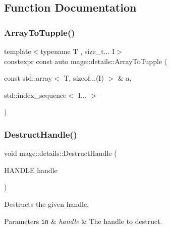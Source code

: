 \subsection{Function Documentation}
\mbox{\label{namespacemage_1_1details_a282e14de1d24b9f356912f8ac3bb868d}} 
\subsubsection{\texorpdfstring{Array\+To\+Tupple()}{ArrayToTupple()}}
{\footnotesize\ttfamily template$<$typename T , size\+\_\+t... I$>$ \\
constexpr const auto mage\+::details\+::\+Array\+To\+Tupple (\begin{DoxyParamCaption}\item[{const std\+::array$<$ T, sizeof...(I) $>$ \&}]{a,  }\item[{std\+::index\+\_\+sequence$<$ I... $>$}]{ }\end{DoxyParamCaption})\hspace{0.3cm}{\ttfamily [noexcept]}}

\mbox{\label{namespacemage_1_1details_a213580128442b2980ad4c3c82bf80ee8}} 
\subsubsection{\texorpdfstring{Destruct\+Handle()}{DestructHandle()}}
{\footnotesize\ttfamily void mage\+::details\+::\+Destruct\+Handle (\begin{DoxyParamCaption}\item[{H\+A\+N\+D\+LE}]{handle }\end{DoxyParamCaption})\hspace{0.3cm}{\ttfamily [noexcept]}}

Destructs the given handle.


\begin{DoxyParams}[1]{Parameters}
\mbox{\tt in}  & {\em handle} & The handle to destruct. \\
\hline
\end{DoxyParams}
\mbox{\label{namespacemage_1_1details_af8daa2a877610f68e45c4ac35c69dc06}} 
